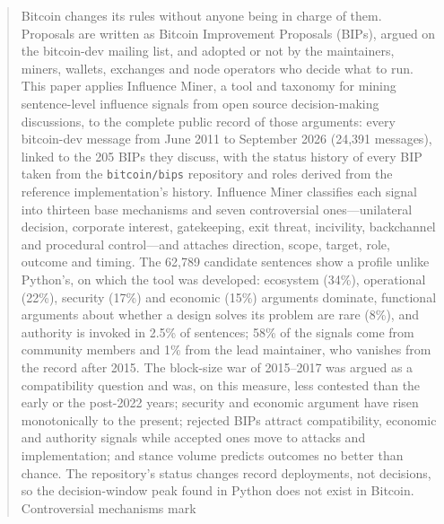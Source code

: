 \begin{abstract}
Bitcoin changes its rules without anyone being in charge of them. Proposals are written as Bitcoin Improvement Proposals (BIPs), argued on the bitcoin-dev mailing list, and adopted or not by the maintainers, miners, wallets, exchanges and node operators who decide what to run. This paper applies Influence Miner, a tool and taxonomy for mining sentence-level influence signals from open source decision-making discussions, to the complete public record of those arguments: every bitcoin-dev message from June 2011 to September 2026 (24,391 messages), linked to the 205 BIPs they discuss, with the status history of every BIP taken from the \texttt{bitcoin/bips} repository and roles derived from the reference implementation's history. Influence Miner classifies each signal into thirteen base mechanisms and seven controversial ones---unilateral decision, corporate interest, gatekeeping, exit threat, incivility, backchannel and procedural control---and attaches direction, scope, target, role, outcome and timing. The 62,789 candidate sentences show a profile unlike Python's, on which the tool was developed: ecosystem (34\%), operational (22\%), security (17\%) and economic (15\%) arguments dominate, functional arguments about whether a design solves its problem are rare (8\%), and authority is invoked in 2.5\% of sentences; 58\% of the signals come from community members and 1\% from the lead maintainer, who vanishes from the record after 2015. The block-size war of 2015--2017 was argued as a compatibility question and was, on this measure, less contested than the early or the post-2022 years; security and economic argument have risen monotonically to the present; rejected BIPs attract compatibility, economic and authority signals while accepted ones move to attacks and implementation; and stance volume predicts outcomes no better than chance. The repository's status changes record deployments, not decisions, so the decision-window peak found in Python does not exist in Bitcoin. Controversial mechanisms mark %
\end{abstract}
